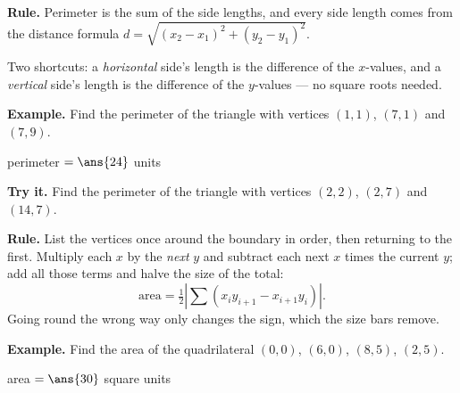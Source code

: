 \documentclass[12pt]{article}
\begin{document}


\begin{formulabox}
\textbf{Rule.} Perimeter is the sum of the side lengths, and every side length
comes from the distance formula
$d = \sqrt{(x_2-x_1)^2 + (y_2-y_1)^2}$.\par
Two shortcuts: a \emph{horizontal} side's length is the difference of the
$x$-values, and a \emph{vertical} side's length is the difference of the
$y$-values --- no square roots needed.
\end{formulabox}

\begin{examplebox}
\textbf{Example.} Find the perimeter of the triangle with vertices $(1,1)$,
$(7,1)$ and $(7,9)$.

perimeter $= \ans{24}$ units
\end{examplebox}

\begin{tryitbox}
\textbf{Try it.} Find the perimeter of the triangle with vertices $(2,2)$,
$(2,7)$ and $(14,7)$.\\[2pt]
\end{tryitbox}


\begin{formulabox}
\textbf{Rule.} List the vertices once around the boundary in order, then
returning to the first. Multiply each $x$ by the \emph{next} $y$ and subtract
each next $x$ times the current $y$; add all those terms and halve the size of
the total:
\[ \text{area} = \tfrac{1}{2}\left| \sum \left( x_i y_{i+1} - x_{i+1} y_i \right) \right| . \]
Going round the wrong way only changes the sign, which the size bars remove.
\end{formulabox}

\begin{examplebox}
\textbf{Example.} Find the area of the quadrilateral $(0,0)$, $(6,0)$, $(8,5)$,
$(2,5)$.

area $= \ans{30}$ square units
\end{examplebox}
\end{document}
